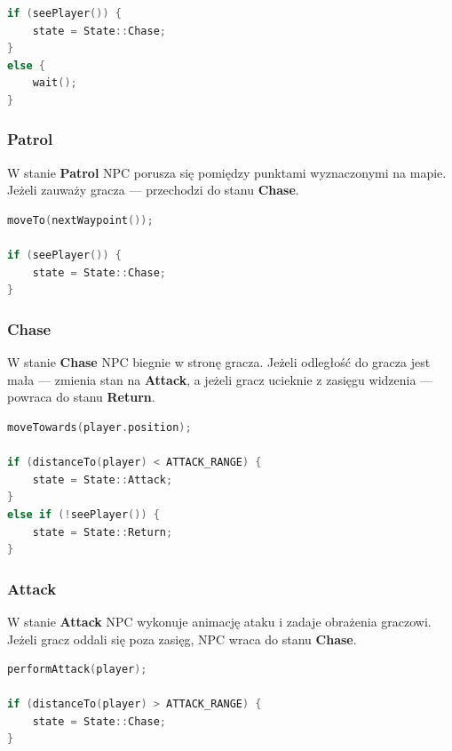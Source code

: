 \documentclass[a4paper,12pt]{book} %
\begin{document}
\begin{lstlisting}[language=C++, caption={Stan Idle}, label={lst:fsm_idle}]
if (seePlayer()) {
    state = State::Chase;
}
else {
    wait();
}
\end{lstlisting}

\subsubsection*{Patrol}

W stanie \textbf{Patrol} NPC porusza się pomiędzy punktami wyznaczonymi na mapie. 
Jeżeli zauważy gracza — przechodzi do stanu \textbf{Chase}.

\begin{lstlisting}[language=C++, caption={Stan Patrol}, label={lst:fsm_patrol}]
moveTo(nextWaypoint());

if (seePlayer()) {
    state = State::Chase;
}
\end{lstlisting}

\subsubsection*{Chase}

W stanie \textbf{Chase} NPC biegnie w stronę gracza. 
Jeżeli odległość do gracza jest mała — zmienia stan na \textbf{Attack}, 
a jeżeli gracz ucieknie z zasięgu widzenia — powraca do stanu \textbf{Return}.

\begin{lstlisting}[language=C++, caption={Stan Chase}, label={lst:fsm_chase}]
moveTowards(player.position);

if (distanceTo(player) < ATTACK_RANGE) {
    state = State::Attack;
}
else if (!seePlayer()) {
    state = State::Return;
}
\end{lstlisting}

\subsubsection*{Attack}

W stanie \textbf{Attack} NPC wykonuje animację ataku i zadaje obrażenia graczowi. 
Jeżeli gracz oddali się poza zasięg, NPC wraca do stanu \textbf{Chase}.

\begin{lstlisting}[language=C++, caption={Stan Attack}, label={lst:fsm_attack}]
performAttack(player);

if (distanceTo(player) > ATTACK_RANGE) {
    state = State::Chase;
}
\end{lstlisting}
\end{document}
